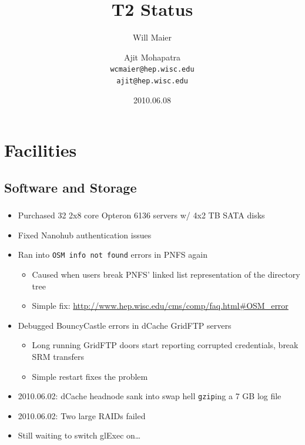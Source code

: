 \documentclass{beamer}
\title{T2 Status}
\author[Maier, Mohapatra]{
    Will Maier \and Ajit Mohapatra\\
    {\tt wcmaier@hep.wisc.edu}\\
    {\tt ajit@hep.wisc.edu}}
\institute[Wisconsin]{University of Wisconsin - High Energy Physics}
\date{2010.06.08}
\begin{document}
\begin{frame}
    \titlepage
\end{frame}


\section{Facilities}
\subsection{Software and Storage}
\begin{frame}
\frametitle{}

\begin{itemize}
	\item Purchased 32 2x8 core Opteron 6136 servers w/ 4x2 TB SATA disks
	\item Fixed Nanohub authentication issues
	\item Ran into {\tt OSM info not found} errors in PNFS again
	\begin{itemize}
		\item Caused when users break PNFS' linked list representation of the directory tree
		\item Simple fix: \url{http://www.hep.wisc.edu/cms/comp/faq.html\#OSM\_error}
	\end{itemize}
	\item Debugged BouncyCastle errors in dCache GridFTP servers
	\begin{itemize}
		\item Long running GridFTP doors start reporting corrupted credentials, break SRM transfers
		\item Simple restart fixes the problem
	\end{itemize}
	\item 2010.06.02: dCache headnode sank into swap hell {\tt gzip}ing a 7 GB log file
	\item 2010.06.02: Two large RAIDs failed
	\item Still waiting to switch glExec on\ldots{}
\end{itemize}
\end{frame}
\end{document}
